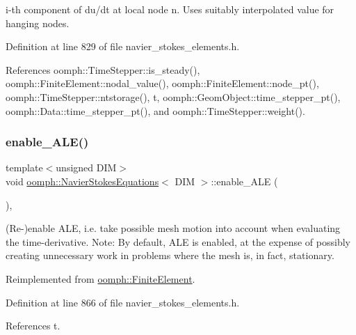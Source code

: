 i-\/th component of du/dt at local node n. Uses suitably interpolated value for hanging nodes. 



Definition at line 829 of file navier\+\_\+stokes\+\_\+elements.\+h.



References oomph\+::\+Time\+Stepper\+::is\+\_\+steady(), oomph\+::\+Finite\+Element\+::nodal\+\_\+value(), oomph\+::\+Finite\+Element\+::node\+\_\+pt(), oomph\+::\+Time\+Stepper\+::ntstorage(), t, oomph\+::\+Geom\+Object\+::time\+\_\+stepper\+\_\+pt(), oomph\+::\+Data\+::time\+\_\+stepper\+\_\+pt(), and oomph\+::\+Time\+Stepper\+::weight().

\mbox{\label{classoomph_1_1NavierStokesEquations_a8b3449281debf059f2386526f8b0ee24}} 
\subsubsection{\texorpdfstring{enable\+\_\+\+A\+L\+E()}{enable\_ALE()}}
{\footnotesize\ttfamily template$<$unsigned D\+IM$>$ \\
void \hyperlink{classoomph_1_1NavierStokesEquations}{oomph\+::\+Navier\+Stokes\+Equations}$<$ D\+IM $>$\+::enable\+\_\+\+A\+LE (\begin{DoxyParamCaption}{ }\end{DoxyParamCaption})\hspace{0.3cm}{\ttfamily [inline]}, {\ttfamily [virtual]}}



(Re-\/)enable A\+LE, i.\+e. take possible mesh motion into account when evaluating the time-\/derivative. Note\+: By default, A\+LE is enabled, at the expense of possibly creating unnecessary work in problems where the mesh is, in fact, stationary. 



Reimplemented from \hyperlink{classoomph_1_1FiniteElement_a92ef8967fa4e2d6c33c51ea3efa3aa82}{oomph\+::\+Finite\+Element}.



Definition at line 866 of file navier\+\_\+stokes\+\_\+elements.\+h.



References t.



